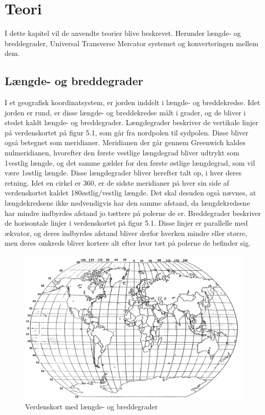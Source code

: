 \chapter{Teori} 
I dette kapitel vil de anvendte teorier blive beskrevet. Herunder længde- og breddegrader, Universal Transverse Mercator systemet og konverteringen mellem dem. 

\section{Længde- og breddegrader}
I et geografisk koordinatsystem, er jorden inddelt i længde- og breddekredse. Idet jorden er rund, er disse længde- og breddekredse målt i grader, og de bliver i stedet kaldt længde- og breddegrader. \newline
Længdegrader beskriver de vertikale linjer på verdenskortet på figur 5.1, som går fra nordpolen til sydpolen. Disse bliver også betegnet som meridianer. Meridianen der går gennem Greenwich kaldes nulmeridianen, hvorefter den første vestlige længdegrad bliver udtrykt som 1\textdegree vestlig længde, og det samme gælder for den første østlige længdegrad, som vil være 1\textdegree østlig længde. Disse længdegrader bliver herefter talt op, i hver deres retning. Idet en cirkel er 360\textdegree, er de sidste meridianer på hver sin side af verdenskortet kaldet 180\textdegree østlig/vestlig længde. Det skal desuden også nævnes, at længdekredsene ikke nødvendigvis har den samme afstand, da længdekredsene har mindre indbyrdes afstand jo tættere på polerne de er. \newline
Breddegrader beskriver de horisontale linjer i verdenskortet på figur 5.1. Disse linjer er parallelle med ækvator, og deres indbyrdes afstand bliver derfor hverken mindre eller større, men deres omkreds bliver kortere alt efter hvor tæt på polerne de befinder sig. \citep{LongLat}

\begin{figure} [h]
	\centering
	\includegraphics[width=.5\textwidth]{billeder/longlatmap}
	\caption{Verdenskort med længde- og breddegrader}
\end{figure}

